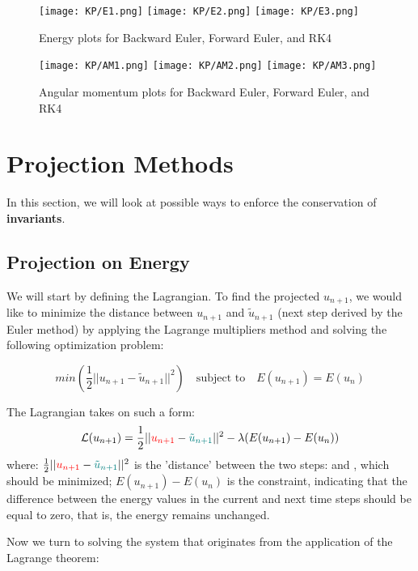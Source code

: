 \documentclass[11pt]{article}
\begin{document}
\begin{figure}[H]
  \centering
  \texttt{[image: KP/E1.png]} \hfill
  \texttt{[image: KP/E2.png]} \hfill
  \texttt{[image: KP/E3.png]} 
  \caption{Energy plots for Backward Euler, Forward Euler, and RK4}
  \label{fig:three-in-line}
\end{figure}

\begin{figure}[H]
  \centering
  \texttt{[image: KP/AM1.png]} \hfill
  \texttt{[image: KP/AM2.png]} \hfill
  \texttt{[image: KP/AM3.png]} 
  \caption{Angular momentum plots for Backward Euler, Forward Euler, and RK4}
  \label{fig:three-in-line}
\end{figure}


\section{Projection Methods}
In this section, we will look at possible ways to enforce the conservation of \textbf{invariants}.

\subsection{Projection on Energy}
We will start by defining the Lagrangian. To find the projected $u_{n+1}$, we would like to minimize the distance between $u_{n+1}$ and $\tilde{u}_{n+1}$ (next step derived by the Euler method) by applying the Lagrange multipliers method and solving the following optimization problem:

\[
min(\frac{1}{2}||u_{n+1} - \tilde{u} _{n+1}||^2) \quad \text{subject to} \quad E(u_{n+1}) = E(u_n)
\]

The Lagrangian takes on such a form:
\[
\mathcal{L}(u_{n+1}) = \frac{1}{2}||{\color{red}{u_{n+1}}} - {\color{teal}{\tilde{u} _{n+1}}}||^2 - \lambda (E(u_{n+1}) - E(u_n))
\]
where: $\frac{1}{2}||{\color{red}{u_{n+1}}} - {\color{teal}{\tilde{u} _{n+1}}}||^2$ is the 'distance' between the two steps: {\color{red}{projected}} and {\color{teal}{original}}, which should be minimized; $E(u_{n+1}) - E(u_n)$ is the constraint, indicating that the difference between the energy values in the current and next time steps should be equal to zero, that is, the energy remains unchanged.

Now we turn to solving the system that originates from the application of the Lagrange theorem:
\end{document}
